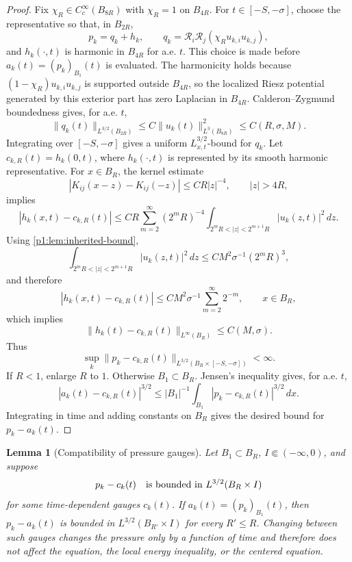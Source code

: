 \documentclass[11pt]{amsart}
\theoremstyle{plain}
\newtheorem{lemma}[lemma]{Lemma}
\theoremstyle{definition}
\theoremstyle{remark}
\numberwithin{equation}{section}
\begin{document}
\begin{proof}
Fix \(\chi_R\in C_c^\infty(B_{8R})\) with \(\chi_R=1\) on \(B_{4R}\).  For
\(t\in[-S,-\sigma]\), choose the representative so that, in \(B_{2R}\),
\[
   p_k=q_k+h_k,\qquad
   q_k=\mathcal R_i\mathcal R_j(\chi_Ru_{k,i}u_{k,j}),
\]
and \(h_k(\cdot,t)\) is harmonic in \(B_{4R}\) for a.e. \(t\).  This choice
is made before \(a_k(t)=(p_k)_{B_1}(t)\) is evaluated.  The harmonicity holds
because \((1-\chi_R)u_{k,i}u_{k,j}\) is supported outside \(B_{4R}\), so the
localized Riesz potential generated by this exterior part has zero Laplacian
in \(B_{4R}\).  Calderon--Zygmund boundedness gives, for a.e. \(t\),
\[
   \|q_k(t)\|_{L^{3/2}(B_{2R})}
   \le C\|u_k(t)\|_{L^3(B_{8R})}^2
   \le C(R,\sigma,M).
\]
Integrating over \([-S,-\sigma]\) gives a uniform
\(L^{3/2}_{x,t}\)-bound for \(q_k\).
Let \(c_{k,R}(t)=h_k(0,t)\), where \(h_k(\cdot,t)\) is represented by its
smooth harmonic representative.  For \(x\in B_R\), the kernel estimate
\[
   |K_{ij}(x-z)-K_{ij}(-z)|\le C R|z|^{-4},\qquad |z|>4R,
\]
implies
\[
   |h_k(x,t)-c_{k,R}(t)|
   \le C R\sum_{m=2}^\infty(2^mR)^{-4}
   \int_{2^mR<|z|<2^{m+1}R}|u_k(z,t)|^2\,dz .
\]
Using \cref{p1:lem:inherited-bound},
\[
   \int_{2^mR<|z|<2^{m+1}R}|u_k(z,t)|^2\,dz
   \le C M^2\sigma^{-1}(2^mR)^3,
\]
and therefore
\[
   |h_k(x,t)-c_{k,R}(t)|
   \le C M^2\sigma^{-1}\sum_{m=2}^{\infty}2^{-m},
   \qquad x\in B_R,
\]
which implies
\[
   \|h_k(t)-c_{k,R}(t)\|_{L^\infty(B_R)}\le C(M,\sigma).
\]
Thus
\[
   \sup_k\|p_k-c_{k,R}(t)\|_{L^{3/2}(B_R\times[-S,-\sigma])}<\infty .
\]
If \(R<1\), enlarge \(R\) to \(1\).  Otherwise \(B_1\subset B_R\).  Jensen's
inequality gives, for a.e. \(t\),
\[
   |a_k(t)-c_{k,R}(t)|^{3/2}
   \le
   |B_1|^{-1}\int_{B_1}|p_k-c_{k,R}(t)|^{3/2}\,dx .
\]
Integrating in time and adding constants on \(B_R\) gives the desired bound
for \(p_k-a_k(t)\).
\end{proof}

\begin{lemma}[Compatibility of pressure gauges]\label{p1:lem:gauge-compatibility}
Let \(B_1\subset B_R\), \(I\Subset(-\infty,0)\), and suppose
\[
   p_k-c_k(t)
   \quad\hbox{is bounded in }L^{3/2}(B_R\times I)
\]
for some time-dependent gauges \(c_k(t)\).  If
\(a_k(t)=(p_k)_{B_1}(t)\), then \(p_k-a_k(t)\) is bounded in
\(L^{3/2}(B_{R'}\times I)\) for every \(R'\le R\).  Changing between such
gauges changes the pressure only by a function of time and therefore does not
affect the equation, the local energy inequality, or the centered equation.
\end{lemma}
\end{document}
